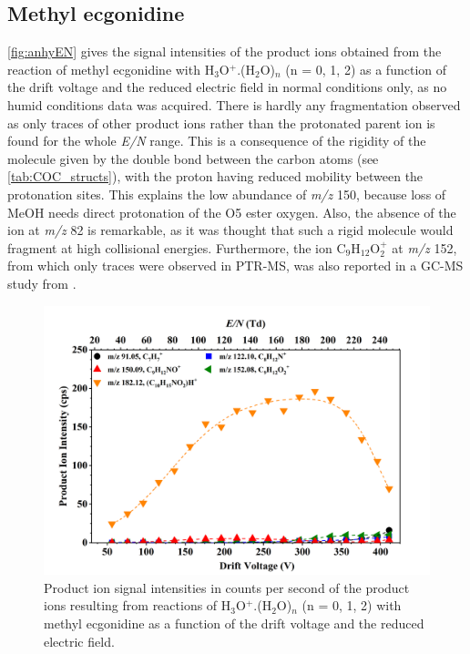 \subsection{Methyl ecgonidine}



\autoref{fig:anhyEN} gives the signal intensities of the product ions obtained from the reaction of methyl ecgonidine with H$_3$O$^+$.(H$_2$O)$_n$ (n = 0, 1, 2) as a function of the drift voltage and the reduced electric field in normal conditions only, as no humid conditions data was acquired.
%
There is hardly any fragmentation observed as only traces of other product ions rather than the protonated parent ion is found for the whole \textit{E/N} range.
%
This is a consequence of the rigidity of the molecule given by the double bond between the carbon atoms (see \autoref{tab:COC_structs}), with the proton having reduced mobility between the protonation sites.
%
This explains the low abundance of \textit{m/z} 150, because loss of MeOH needs direct protonation of the O5 ester oxygen.
%
Also, the absence of the ion at \textit{m/z} 82 is remarkable, as it was thought that such a rigid molecule would fragment at high collisional energies.
%
Furthermore, the ion C$_9$H$_{12}$O$_2^+$ at \textit{m/z} 152, from which only traces were observed in PTR-MS, was also reported in a GC-MS study from \citeauthor{paul2005concentration} 
\cite{paul2005concentration}.



\begin{figure}[htbp]
\centering
\includegraphics[width=0.8\linewidth]{pics/cocaine-chapter/ame-cps.png}
\caption{Product ion signal intensities in counts per second of the product ions resulting from reactions of H$_3$O$^+$.(H$_2$O)$_n$ (n = 0, 1, 2) with methyl ecgonidine as a function of the drift voltage and the reduced electric field.} 
\label{fig:anhyEN}
\end{figure}


